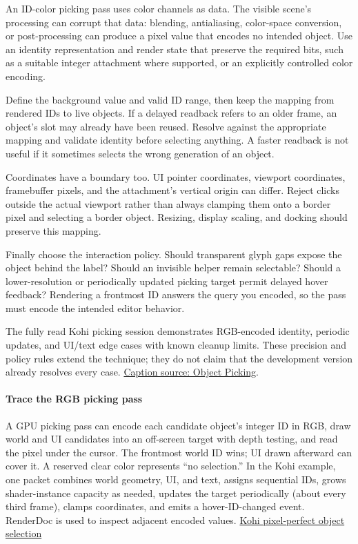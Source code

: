 An ID-color picking pass uses color channels as data. The visible scene's processing can corrupt that data: blending, antialiasing, color-space conversion, or post-processing can produce a pixel value that encodes no intended object. Use an identity representation and render state that preserve the required bits, such as a suitable integer attachment where supported, or an explicitly controlled color encoding.

Define the background value and valid ID range, then keep the mapping from rendered IDs to live objects. If a delayed readback refers to an older frame, an object's slot may already have been reused. Resolve against the appropriate mapping and validate identity before selecting anything. A faster readback is not useful if it sometimes selects the wrong generation of an object.

Coordinates have a boundary too. UI pointer coordinates, viewport coordinates, framebuffer pixels, and the attachment's vertical origin can differ. Reject clicks outside the actual viewport rather than always clamping them onto a border pixel and selecting a border object. Resizing, display scaling, and docking should preserve this mapping.

Finally choose the interaction policy. Should transparent glyph gaps expose the object behind the label? Should an invisible helper remain selectable? Should a lower-resolution or periodically updated picking target permit delayed hover feedback? Rendering a frontmost ID answers the query you encoded, so the pass must encode the intended editor behavior.

The fully read Kohi picking session demonstrates RGB-encoded identity, periodic updates, and UI/text edge cases with known cleanup limits. These precision and policy rules extend the technique; they do not claim that the development version already resolves every case. \href{https://www.youtube.com/watch?v=mx1TyxNFrdo}{Caption source: Object Picking}.

\paragraph{Trace the RGB picking pass}\label{06-engine-ii-ch032-trace-the-rgb-picking-pass}

\hypertarget{06-engine-ii-ch032-trace-the-rgb-picking-pass}{}

A GPU picking pass can encode each candidate object's integer ID in RGB, draw world and UI candidates into an off-screen target with depth testing, and read the pixel under the cursor. The frontmost world ID wins; UI drawn afterward can cover it. A reserved clear color represents ``no selection.'' In the Kohi example, one packet combines world geometry, UI, and text, assigns sequential IDs, grows shader-instance capacity as needed, updates the target periodically (about every third frame), clamps coordinates, and emits a hover-ID-changed event. RenderDoc is used to inspect adjacent encoded values. \href{https://www.youtube.com/watch?v=mx1TyxNFrdo}{Kohi pixel-perfect object selection}

